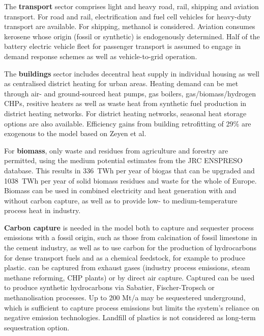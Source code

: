 The \textbf{transport} sector comprises light and heavy road, rail, shipping and
aviation transport. For road and rail, electrification and fuel cell vehicles
for heavy-duty transport are available. For shipping, methanol is considered.
Aviation consumes kerosene whose origin (fossil or synthetic) is endogenously
determined. Half of the battery electric vehicle fleet for passenger transport
is assumed to engage in demand response schemes as well as vehicle-to-grid
operation.

The \textbf{buildings} sector includes decentral heat supply in individual
housing as well as centralised district heating for urban areas. Heating demand
can be met through air- and ground-sourced heat pumps, gas boilers,
gas/biomass/hydrogen CHPs, resitive heaters as well as waste heat from synthetic
fuel production in district heating networks. For district heating networks,
seasonal heat storage options are also available. Efficiency gains from building
retrofitting of 29\% are exogenous to the model based on Zeyen et
al.\cite{zeyenMitigatingHeat2021}

For \textbf{biomass}, only waste and residues from agriculture and forestry are
permitted, using the medium potential estimates from the JRC ENSPRESO database.
\cite{ruizENSPRESOOpen2019} This results in 336~TWh per year of biogas that can
be upgraded and 1038~TWh per year of solid biomass residues and waste for the
whole of Europe. Biomass can be used in combined electricity and heat generation
with and without carbon capture, as well as to provide low- to
medium-temperature process heat in industry.

\textbf{Carbon capture} is needed in the model both to capture and sequester
process emissions with a fossil origin, such as those from calcination of fossil
limestone in the cement industry, as well as to use carbon for the production of
hydrocarbons for dense transport fuels and as a chemical feedstock, for example
to produce plastic. \co can be captured from exhaust gases (industry process
emissions, steam methane reforming, CHP plants) or by direct air capture.
Captured \co can be used to produce synthetic hydrocarbons via Sabatier,
Fischer-Tropsch or methanolisation processes. Up to 200 Mt\co/a may be
sequestered underground, which is sufficient to capture process emissions but
limits the system's reliance on negative emission technologies. Landfill of
plastics is not considered as long-term sequestration option.